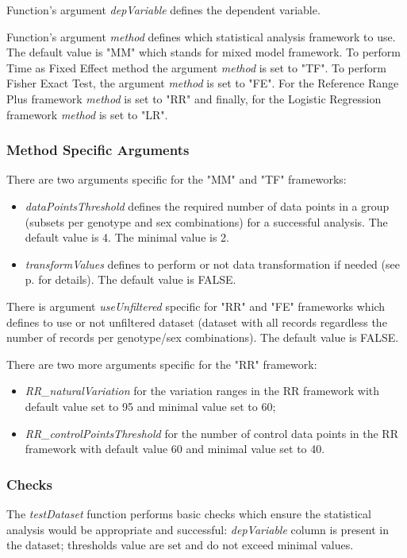 \documentclass[12pt,a4paper]{article}
\begin{document}
Function's argument \textit{depVariable} defines the dependent variable.

Function's argument \textit{method} defines which statistical analysis framework to use. 
The default value is "MM" which stands for mixed model framework. To perform Time as Fixed Effect method the argument \textit{method} is set to "TF". To perform Fisher Exact Test, the argument \textit{method} is set to "FE". For the Reference Range Plus framework \textit{method} is set to "RR" and finally, for the Logistic Regression framework \textit{method} is set to "LR".

\subsubsection{Method Specific Arguments} \label{specificArguments}

There are two arguments specific for the "MM" and "TF" frameworks: 
\begin{itemize}
\item \textit{dataPointsThreshold} defines the required number of data points in a group (subsets per genotype and sex combinations) for a successful analysis. The default value is 4. The minimal value is 2.
\item \textit{transformValues} defines to perform or not data transformation if needed (see p.\pageref{section:transformation} for details). The default value is FALSE.
\end{itemize}

There is argument \textit{useUnfiltered} specific for "RR" and "FE" frameworks which defines to use or not unfiltered dataset (dataset with all records regardless the number of records per genotype/sex combinations). The default value is FALSE.

There are two more arguments specific for the "RR" framework: 
\begin{itemize}
\item \textit{RR\_naturalVariation} for the variation ranges in the RR framework with default value set to 95 and minimal value set to 60; 
\item \textit{RR\_controlPointsThreshold} for the number of control data points in the RR framework with default value 60 and minimal value set to 40.
\end{itemize}

\subsubsection{Checks}
The \textit{testDataset} function performs basic checks which ensure the statistical analysis would be appropriate and successful: \textit{depVariable} column is present in the dataset; thresholds value are set and do not exceed minimal values.
\end{document}
